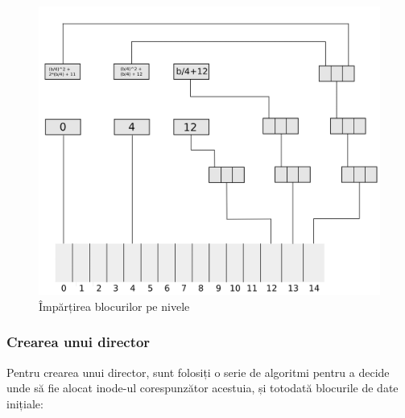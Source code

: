 \begin{figure}[h!]
    \centering
    \includegraphics[width=0.9\linewidth]{images/2.7.png}
    \caption{Împărțirea blocurilor pe nivele}
    \label{fig:enter-label}
\end{figure}

\bigskip


\subsubsection{Crearea unui director}

Pentru crearea unui director, sunt folosiți o serie de algoritmi pentru a decide unde să fie alocat inode-ul corespunzător acestuia, și totodată blocurile de date inițiale:

